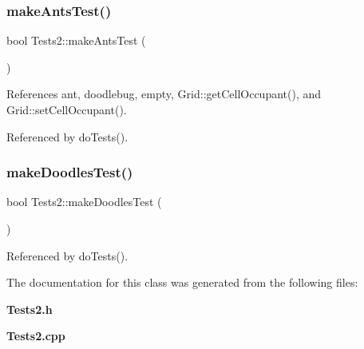 \subsubsection{make\+Ants\+Test()}
{\footnotesize\ttfamily bool Tests2\+::make\+Ants\+Test (\begin{DoxyParamCaption}{ }\end{DoxyParamCaption})}



References ant, doodlebug, empty, Grid\+::get\+Cell\+Occupant(), and Grid\+::set\+Cell\+Occupant().



Referenced by do\+Tests().

\mbox{\label{classTests2_a0c6c7e5d60e7c6dc8799fa14e2b997b4}} 
\subsubsection{make\+Doodles\+Test()}
{\footnotesize\ttfamily bool Tests2\+::make\+Doodles\+Test (\begin{DoxyParamCaption}{ }\end{DoxyParamCaption})}



Referenced by do\+Tests().



The documentation for this class was generated from the following files\+:\begin{DoxyCompactItemize}
\item 
\textbf{ Tests2.\+h}\item 
\textbf{ Tests2.\+cpp}\end{DoxyCompactItemize}

